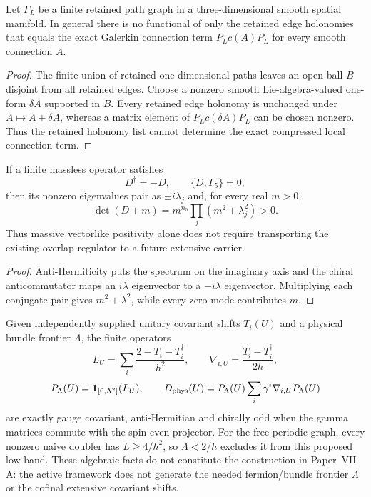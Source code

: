 \documentclass[12pt,a4paper]{article}
\begin{document}
\begin{proposition}
\label{p10:prop:v2180-finite-holonomy-dirac-no-go}
Let $\Gamma_L$ be a finite retained path graph in a three-dimensional smooth
spatial manifold.  In general there is no functional of only the retained
edge holonomies that equals the exact Galerkin connection term $P_Lc(A)P_L$
for every smooth connection $A$.
\end{proposition}
\begin{proof}
The finite union of retained one-dimensional paths leaves an open ball $B$
disjoint from all retained edges.  Choose a nonzero smooth Lie-algebra-valued
one-form $\delta A$ supported in $B$.  Every retained edge holonomy is
unchanged under $A\mapsto A+\delta A$, whereas a matrix element of
$P_Lc(\delta A)P_L$ can be chosen nonzero.  Thus the retained holonomy list
cannot determine the exact compressed local connection term.
\end{proof}

\begin{lemma}
\label{p10:lem:v2180-positive-mass-chiral-antihermitian}
If a finite massless operator satisfies
\[
 D^\dagger=-D,\qquad \{D,\Gamma_5\}=0,
\]
then its nonzero eigenvalues pair as $\pm i\lambda_j$ and, for every real
$m>0$,
\[
 \boxed{\det(D+m)=m^{n_0}\prod_j(m^2+\lambda_j^2)>0.}
\]
Thus massive vectorlike positivity alone does not require transporting the
existing overlap regulator to a future extensive carrier.
\end{lemma}
\begin{proof}
Anti-Hermiticity puts the spectrum on the imaginary axis and the chiral
anticommutator maps an $i\lambda$ eigenvector to a $-i\lambda$ eigenvector.
Multiplying each conjugate pair gives $m^2+\lambda^2$, while every zero mode
contributes $m$.
\end{proof}

\begin{remark}
\label{p10:rem:v2180-graph-laplacian-extension-candidate}
Given independently supplied unitary covariant shifts $T_i(U)$ and a physical
bundle frontier $\Lambda$, the finite operators
\[
 L_U=\sum_i\frac{2-T_i-T_i^\dagger}{h^2},\qquad
 \nabla_{i,U}=\frac{T_i-T_i^\dagger}{2h},
\]
\[
 P_\Lambda(U)=\mathbf1_{[0,\Lambda^2]}(L_U),\qquad
 D_{\rm phys}(U)=P_\Lambda(U)\sum_i\gamma^i\nabla_{i,U}P_\Lambda(U)
\]
are exactly gauge covariant, anti-Hermitian and chirally odd when the gamma
matrices commute with the spin-even projector.  For the free periodic graph,
every nonzero naive doubler has $L\ge4/h^2$, so $\Lambda<2/h$ excludes it from
this proposed low band.  These algebraic facts do not constitute the
construction in Paper~VII-A: the active framework does not generate the needed
fermion/bundle frontier $\Lambda$ or the cofinal extensive covariant shifts.
\end{remark}
\end{document}
